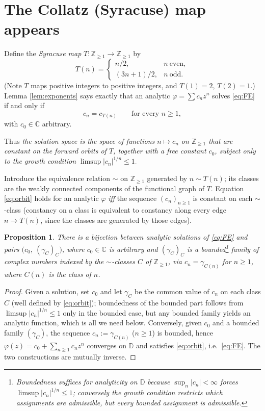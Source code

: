 \documentclass{amsart}
\newtheorem{proposition}{Proposition}
\theoremstyle{remark}
\begin{document}
\section{The Collatz (Syracuse) map appears}

Define the \emph{Syracuse map} $T:\mathbb{Z}_{\ge1}\to\mathbb{Z}_{\ge1}$ by
\[
T(n)=
\begin{cases}
n/2, & n\ \text{even},\\
(3n+1)/2, & n\ \text{odd}.
\end{cases}
\]
(Note $T$ maps positive integers to positive integers, and $T(1)=2$, $T(2)=1$.) Lemma
\ref{lem:exponents} says exactly that an analytic $\varphi=\sum c_n z^n$ solves \eqref{eq:FE}
if and only if
\begin{equation}\label{eq:orbit}
c_n=c_{T(n)}\qquad\text{for every } n\ge1,
\end{equation}
with $c_0\in\mathbb{C}$ arbitrary.

Thus \emph{the solution space is the space of functions $n\mapsto c_n$ on $\mathbb{Z}_{\ge1}$
that are constant on the forward orbits of $T$, together with a free constant $c_0$, subject only
to the growth condition} $\limsup|c_n|^{1/n}\le1$.

Introduce the equivalence relation $\sim$ on $\mathbb{Z}_{\ge1}$ generated by $n\sim T(n)$; its
classes are the weakly connected components of the functional graph of $T$. Equation
\eqref{eq:orbit} holds for an analytic $\varphi$ \emph{iff} the sequence $(c_n)_{n\ge1}$ is
constant on each $\sim$-class (constancy on a class is equivalent to constancy along every edge
$n\to T(n)$, since the classes are generated by those edges).

\begin{proposition}\label{prop:correspondence}
There is a bijection between analytic solutions of \eqref{eq:FE} and pairs
$\bigl(c_0,\ (\gamma_C)_{C}\bigr)$, where $c_0\in\mathbb{C}$ is arbitrary and
$(\gamma_C)_C$ is a bounded\footnote{Boundedness suffices for analyticity on $\mathbb{D}$ because
$\sup_n|c_n|<\infty$ forces $\limsup|c_n|^{1/n}\le1$; conversely the growth condition restricts
which assignments are admissible, but every \emph{bounded} assignment is admissible.}
family of complex numbers indexed by the $\sim$-classes $C$ of $\mathbb{Z}_{\ge1}$, via
$c_n=\gamma_{C(n)}$ for $n\ge1$, where $C(n)$ is the class of $n$.
\end{proposition}
\begin{proof}
Given a solution, set $c_0$ and let $\gamma_C$ be the common value of $c_n$ on each class $C$
(well defined by \eqref{eq:orbit}); boundedness of the bounded part follows from
$\limsup|c_n|^{1/n}\le1$ only in the bounded case, but any bounded family yields an analytic
function, which is all we need below. Conversely, given $c_0$ and a bounded family
$(\gamma_C)$, the sequence $c_n:=\gamma_{C(n)}$ ($n\ge1$) is bounded, hence
$\varphi(z)=c_0+\sum_{n\ge1}c_n z^n$ converges on $\mathbb{D}$ and satisfies \eqref{eq:orbit},
i.e.\ \eqref{eq:FE}. The two constructions are mutually inverse.
\end{proof}
\end{document}
